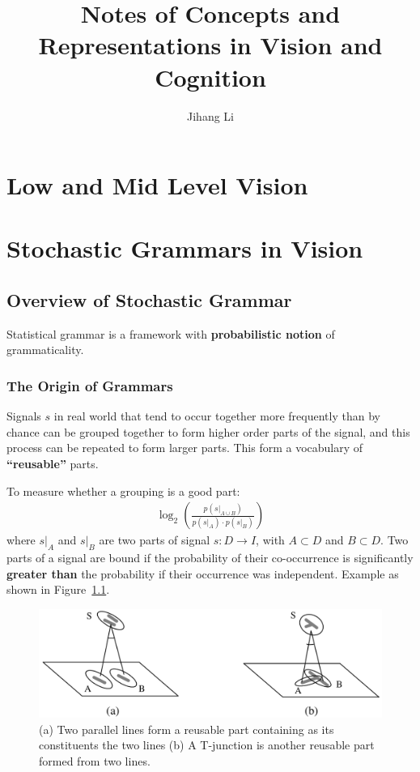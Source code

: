 \documentclass[10pt,oneside]{book}
\title{Notes of Concepts and Representations in Vision and Cognition}
\author{Jihang Li}
\newcommand{\Fig}[1]{Figure~\ref{fig:#1}}
\begin{document}
\maketitle
\tableofcontents

\part{Low and Mid Level Vision}%


\part{Stochastic Grammars in Vision}%
\chapter{Overview of Stochastic Grammar}%
\label{sec:ii.1}
Statistical grammar is a framework with \textbf{probabilistic notion} of
grammaticality.

\section{The Origin of Grammars}%
\label{sec:ii.1.1}
Signals $s$ in real world that tend to occur together more frequently than by
chance can be grouped together to form higher order parts of the signal, and
this process can be repeated to form larger parts. This form a vocabulary of
\textbf{``reusable''} parts.

To measure whether a grouping is a good part:
%
\begin{align}
  \label{eq:ii.1.1}
  \log_2 \left( \frac{p(s\vert_{A \cup B})}{p(s\vert_{A}) \cdot p(s\vert_{B})} \right)
\end{align}
%
where $s\vert_{A}$ and $s\vert_{B}$ are two parts of signal $s: D \rightarrow I$,
with $A \subset D$ and $B \subset D$. Two parts of a signal are bound if the
probability of their co-occurrence is significantly \textbf{greater than} the
probability if their occurrence was independent. Example as shown in
\Fig{ii.1.1}.
%
\begin{figure}[!htpb]
  \centering
  \includegraphics[width=0.8\linewidth]{./fig/fig_ii_1_1.png}
  \caption{(a) Two parallel lines form a reusable part containing as its
    constituents the two lines (b) A T-junction is another reusable part formed
    from two lines.}%
  \label{fig:ii.1.1}
\end{figure}
%
\end{document}
